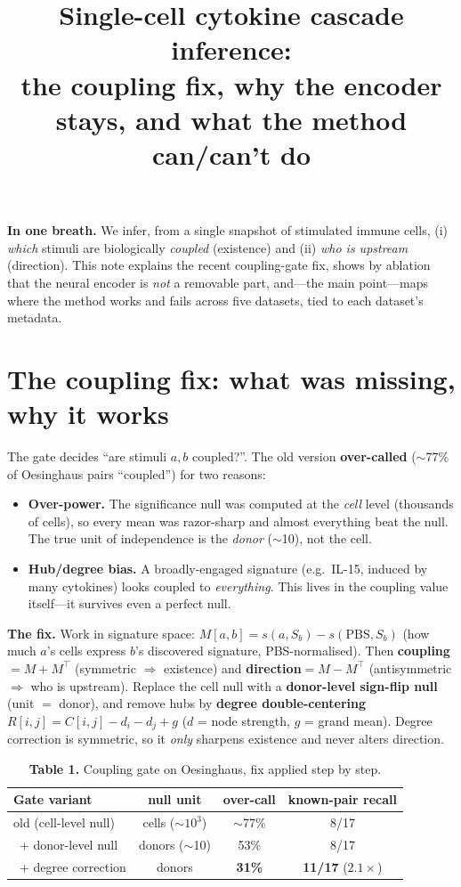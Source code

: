 \documentclass[11pt]{article}
\title{\vspace{-3em}\textbf{Single-cell cytokine cascade inference:\\ the coupling fix, why the encoder stays, and what the method can/can't do}}
\author{}
\date{\vspace{-3em}}
\begin{document}
\maketitle
\vspace{-2.5em}

\noindent\textbf{In one breath.} We infer, from a single snapshot of stimulated immune cells, (i) \emph{which} stimuli are biologically \emph{coupled} (existence) and (ii) \emph{who is upstream} (direction). This note explains the recent coupling-gate fix, shows by ablation that the neural encoder is \emph{not} a removable part, and---the main point---maps where the method works and fails across five datasets, tied to each dataset's metadata.

\section{The coupling fix: what was missing, why it works}
The gate decides ``are stimuli $a,b$ coupled?''. The old version \textbf{over-called} ($\sim$77\% of Oesinghaus pairs ``coupled'') for two reasons:
\begin{itemize}
\item \textbf{Over-power.} The significance null was computed at the \emph{cell} level (thousands of cells), so every mean was razor-sharp and almost everything beat the null. The true unit of independence is the \emph{donor} ($\sim$10), not the cell.
\item \textbf{Hub/degree bias.} A broadly-engaged signature (e.g.\ IL-15, induced by many cytokines) looks coupled to \emph{everything}. This lives in the coupling value itself---it survives even a perfect null.
\end{itemize}
\textbf{The fix.} Work in signature space: $M[a,b]=s(a,S_b)-s(\mathrm{PBS},S_b)$ (how much $a$'s cells express $b$'s discovered signature, PBS-normalised). Then \textbf{coupling}$=M+M^{\top}$ (symmetric $\Rightarrow$ existence) and \textbf{direction}$=M-M^{\top}$ (antisymmetric $\Rightarrow$ who is upstream). Replace the cell null with a \textbf{donor-level sign-flip null} (unit $=$ donor), and remove hubs by \textbf{degree double-centering} $R[i,j]=C[i,j]-d_i-d_j+g$ ($d$ = node strength, $g$ = grand mean). Degree correction is symmetric, so it \emph{only} sharpens existence and never alters direction.

\begin{table}[h]\centering\small
\caption*{\textbf{Table 1.} Coupling gate on Oesinghaus, fix applied step by step.}
\begin{tabular}{lccc}
\toprule
Gate variant & null unit & over-call & known-pair recall \\
\midrule
old (cell-level null) & cells ($\sim10^3$) & $\sim$77\% & 8/17 \\
\ + donor-level null & donors ($\sim$10) & 53\% & 8/17 \\
\rowcolor{hl}\ + degree correction & donors & \textbf{31\%} & \textbf{11/17} ($2.1\times$) \\
\bottomrule
\end{tabular}
\end{table}
\end{document}
